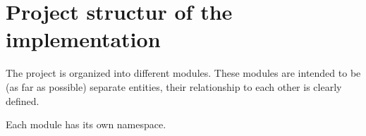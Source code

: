 %
%
%
%


\graphicspath{{./sonstiges/}}
\graphicspath{{./sonstiges/}{../sonstiges}}

\newpage
\part{Project structur of the implementation}
\label{partFibProjectstructurImplementation}

The project is organized into different modules. These modules are intended to be (as far as possible) separate entities, their relationship to each other is clearly defined.

Each module has its own namespace.


